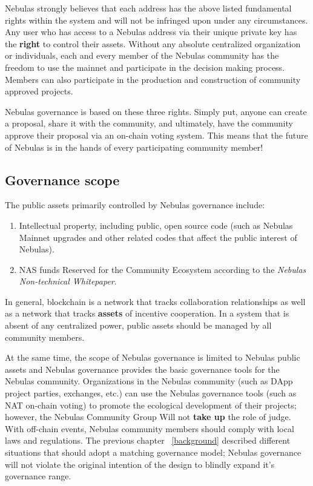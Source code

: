 Nebulas strongly believes that each address has the above listed fundamental rights within the system and will not be infringed upon under any circumstances. Any user who has access to a Nebulas address via their unique private key has the \textbf{right} to control their assets. Without any absolute centralized organization or individuals, each and every member of the Nebulas community has the freedom to use the mainnet and participate in the decision making process. Members can also participate in the production and construction of community approved projects. 

Nebulas governance is based on these three rights. Simply put, anyone can create a proposal, share it with the community, and ultimately, have the community approve their proposal via an on-chain voting system. This means that the future of Nebulas is in the hands of every participating community member!

\subsection{Governance scope}


The public assets primarily controlled by Nebulas governance include:

\begin{enumerate}
	\item Intellectual property, including public, open source code (such as Nebulas Mainnet upgrades and other related codes that affect the public interest of Nebulas).
	\item NAS funds Reserved for the Community Ecosystem according to the \textit{Nebulas Non-technical Whitepaper}.
\end{enumerate}

In general, blockchain is a network that tracks collaboration relationships as well as a network that tracks \textbf{assets} of incentive cooperation. In a system that is absent of any centralized power, public assets should be managed by all community members.

At the same time, the scope of Nebulas governance is limited to Nebulas public assets and Nebulas governance provides the basic governance tools for the Nebulas community. Organizations in the Nebulas community (such as DApp project parties, exchanges, etc.) can use the Nebulas governance tools (such as NAT on-chain voting) to promote the ecological development of their projects; however, the Nebulas Community Group Will not \textbf{take up} the role of judge. With off-chain events, Nebulas community members should comply with local laws and regulations. The previous chapter ~\ref{background} described different situations that should adopt a matching governance model; Nebulas governance will not violate the original intention of the design to blindly expand it's governance range.

